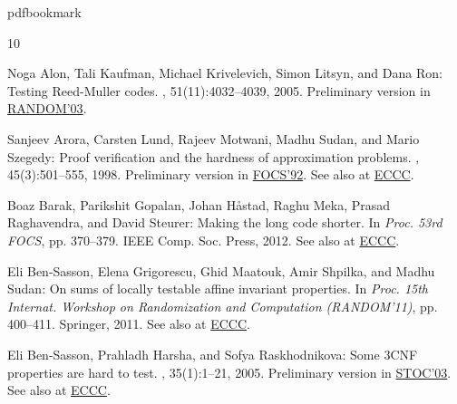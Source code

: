 %
%
%
%
%
\providecommand{\bibhead}[1]{}
%
\expandafter\ifx\csname pdfbookmark\endcsname\relax%
  \providecommand{\tocrefpdfbookmark}{}
\else\providecommand{\tocrefpdfbookmark}{%
   \hypertarget{tocreferences}{}%
   \pdfbookmark[1]{References}{tocreferences}}%
\fi

\tocrefpdfbookmark
\begin{thebibliography}{10}

\bibhead{AKKLR}
{\sc Noga Alon, Tali Kaufman, Michael Krivelevich, Simon Litsyn, and Dana Ron}:
  Testing {Reed-Muller} codes.
, 51(11):4032--4039, 2005.
\newblock Preliminary version in
  \href{http://dx.doi.org/10.1007/978-3-540-45198-3_17}{RANDOM'03}.

\bibhead{ALMSS}
{\sc Sanjeev Arora, Carsten Lund, Rajeev Motwani, Madhu Sudan, and Mario
  Szegedy}: Proof verification and the hardness of approximation problems.
, 45(3):501--555, 1998.
\newblock Preliminary version in
  \href{http://dx.doi.org/10.1109/SFCS.1992.267823}{FOCS'92}. See also at
  \href{http://eccc.hpi-web.de/report/1998/008/}{ECCC}.
\newblock [\epfmtdoi{10.1145/278298.278306}]

\bibhead{BGHMRS}
{\sc Boaz Barak, Parikshit Gopalan, Johan H{\aa}stad, Raghu Meka, Prasad
  Raghavendra, and David Steurer}: Making the long code shorter.
\newblock In {\em Proc. 53rd FOCS}, pp. 370--379. IEEE Comp. Soc. Press, 2012.
\newblock See also at \href{http://eccc.hpi-web.de/report/2011/142/}{ECCC}.

\bibhead{BGMSS11}
{\sc Eli {Ben-Sasson}, Elena Grigorescu, Ghid Maatouk, Amir Shpilka, and Madhu
  Sudan}: On sums of locally testable affine invariant properties.
\newblock In {\em Proc. 15th Internat. Workshop on Randomization and
  Computation (RANDOM'11)}, pp. 400--411. Springer, 2011.
\newblock See also at \href{http://eccc.hpi-web.de/report/2011/079/}{ECCC}.
\newblock [\epfmtdoi{10.1007/978-3-642-22935-0\_34}]

\bibhead{BHR05}
{\sc Eli {Ben-Sasson}, Prahladh Harsha, and Sofya Raskhodnikova}: Some 3{CNF}
  properties are hard to test.
, 35(1):1--21, 2005.
\newblock Preliminary version in
  \href{http://dx.doi.org/10.1145/780542.780594}{STOC'03}. See also at
  \href{http://eccc.hpi-web.de/report/2003/006/}{ECCC}.
\newblock [\epfmtdoi{10.1137/S0097539704445445}]


\end{thebibliography}
